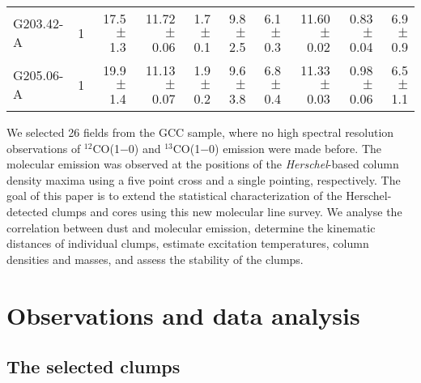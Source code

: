 \documentclass[printer]{aa}
\begin{document}
\begin{table*}[h]
\begin{tabular}{l c r r r r r r r r}
G203.42-A & 1 &  17.5 $\pm$ 1.3 &  11.72 $\pm$ 0.06 & 1.7 $\pm$ 0.1 &  9.8 $\pm$  2.5 &  6.1 $\pm$ 0.3 &  11.60 $\pm$ 0.02 & 0.83 $\pm$ 0.04 &  6.9 $\pm$ 0.9 \\
G205.06-A & 1 &  19.9 $\pm$ 1.4 &  11.13 $\pm$ 0.07 & 1.9 $\pm$ 0.2 &  9.6 $\pm$  3.8 &  6.8 $\pm$ 0.4 &  11.33 $\pm$ 0.03 & 0.98 $\pm$ 0.06 &  6.5 $\pm$ 1.1 \\
\hline
		\end{tabular}
		\label{lineparam1}
\end{table*}

We selected 26 fields from the GCC sample, where no high spectral resolution observations of $^{12}$CO(1$-$0) and $^{13}$CO(1$-$0) emission were made before. The molecular emission was observed at the positions of the \textit{Herschel}-based column density maxima using a five point cross and a single pointing, respectively. The goal of this paper is to extend the statistical characterization of the Herschel-detected clumps and cores using this new molecular line survey. We analyse the correlation between dust and molecular emission, determine the kinematic distances of individual clumps, estimate excitation temperatures, column densities and masses, and assess the stability of the clumps.

\section{Observations and data analysis}
\label{observ}

\subsection{The selected clumps}
\label{clumpselect}
\end{document}
